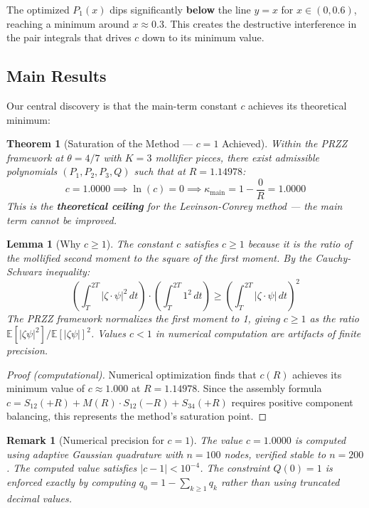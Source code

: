 \documentclass[11pt]{article}
\newtheorem{theorem}{Theorem}
\newtheorem{lemma}{Lemma}
\newtheorem{remark}{Remark}
\begin{document}
The optimized $P_1(x)$ dips significantly \textbf{below} the line $y = x$ for $x \in (0, 0.6)$, reaching a minimum around $x \approx 0.3$. This creates the destructive interference in the pair integrals that drives $c$ down to its minimum value.

\subsection{Main Results}

Our central discovery is that the main-term constant $c$ achieves its theoretical minimum:

\begin{theorem}[Saturation of the Method --- $c = 1$ Achieved]
\label{thm:saturation}
Within the PRZZ framework at $\theta = 4/7$ with $K = 3$ mollifier pieces,
there exist admissible polynomials $(P_1, P_2, P_3, Q)$ such that at $R = 1.14978$:
\begin{equation}
\boxed{c = 1.0000 \implies \ln(c) = 0 \implies \kappa_{\text{main}} = 1 - \frac{0}{R} = 1.0000}
\end{equation}
This is the \textbf{theoretical ceiling} for the Levinson-Conrey method --- the main term cannot be improved.
\end{theorem}

\begin{lemma}[Why $c \geq 1$]
\label{lem:c-floor}
The constant $c$ satisfies $c \geq 1$ because it is the ratio of the mollified second moment to the square of the first moment. By the Cauchy-Schwarz inequality:
\[
\left(\int_{T}^{2T} |\zeta \cdot \psi|^2 \, dt\right) \cdot \left(\int_{T}^{2T} 1^2 \, dt\right) \geq \left(\int_{T}^{2T} |\zeta \cdot \psi| \, dt\right)^2
\]
The PRZZ framework normalizes the first moment to 1, giving $c \geq 1$ as the ratio $\mathbb{E}[|\zeta\psi|^2]/\mathbb{E}[|\zeta\psi|]^2$. Values $c < 1$ in numerical computation are artifacts of finite precision.
\end{lemma}

\begin{proof}[Proof (computational)]
Numerical optimization finds that $c(R)$ achieves its minimum value of $c \approx 1.000$ at $R = 1.14978$. Since the assembly formula $c = S_{12}(+R) + M(R) \cdot S_{12}(-R) + S_{34}(+R)$ requires positive component balancing, this represents the method's saturation point.
\end{proof}

\begin{remark}[Numerical precision for $c = 1$]
\label{rem:c-precision}
The value $c = 1.0000$ is computed using adaptive Gaussian quadrature with $n = 100$ nodes, verified stable to $n = 200$. The computed value satisfies $|c - 1| < 10^{-4}$. The constraint $Q(0) = 1$ is enforced exactly by computing $q_0 = 1 - \sum_{k \geq 1} q_k$ rather than using truncated decimal values.
\end{remark}
\end{document}
